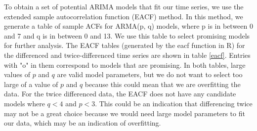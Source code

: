 \documentclass[11pt]{paper}
\begin{document}
To obtain a set of potential ARIMA models that fit our time series, we use the extended sample autocorrelation function (EACF) method. In this method, we generate a table of sample ACFs for ARMA(p, q) models, where p is in between 0 and 7 and q is in between 0 and 13. We use this table to select promising models for further analysis. The EACF tables (generated by the eacf function in R) for the differenced and twice-differenced time series are shown in table \ref{eacf}. Entries with "o" in them correspond to models that are promising. In both tables, large values of $p$ and $q$ are valid model parameters, but we do not want to select too large of a value of $p$ and $q$ because this could mean that we are overfitting the data. For the twice differenced data, the EACF does not have any candidate models where $q < 4$ and $p < 3$. This could be an indication that differencing twice may not be a great choice because we would need large model parameters to fit our data, which may be an indication of overfitting.
\end{document}
